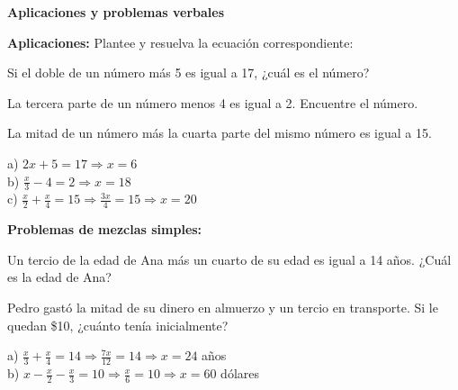 \begin{exercise}
\textbf{Aplicaciones y problemas verbales}

\problem \textbf{Aplicaciones:} Plantee y resuelva la ecuación correspondiente:
\begin{exerciselist}
    \item Si el doble de un número más 5 es igual a 17, ¿cuál es el número?
    \item La tercera parte de un número menos 4 es igual a 2. Encuentre el número.
    \item La mitad de un número más la cuarta parte del mismo número es igual a 15.
\end{exerciselist}

\begin{solucion}
a) $2x + 5 = 17 \Rightarrow x = 6$\\
b) $\frac{x}{3} - 4 = 2 \Rightarrow x = 18$\\
c) $\frac{x}{2} + \frac{x}{4} = 15 \Rightarrow \frac{3x}{4} = 15 \Rightarrow x = 20$
\end{solucion}

\problem \textbf{Problemas de mezclas simples:}
\begin{exerciselist}
    \item Un tercio de la edad de Ana más un cuarto de su edad es igual a 14 años. ¿Cuál es la edad de Ana?
    \item Pedro gastó la mitad de su dinero en almuerzo y un tercio en transporte. Si le quedan \$10, ¿cuánto tenía inicialmente?
\end{exerciselist}

\begin{solucion}
a) $\frac{x}{3} + \frac{x}{4} = 14 \Rightarrow \frac{7x}{12} = 14 \Rightarrow x = 24$ años\\
b) $x - \frac{x}{2} - \frac{x}{3} = 10 \Rightarrow \frac{x}{6} = 10 \Rightarrow x = 60$ dólares
\end{solucion}
\end{exercise}

